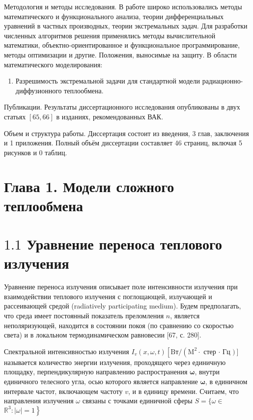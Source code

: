 \documentclass[10pt]{article}
\begin{document}
Методология и методы исследования. В работе широко использовались методы математического и функционального анализа, теории дифференциальных уравнений в частных производных, теории экстремальных задач. Для разработки численных алгоритмов решения применялись методы вычислительной математики, объектно-ориентированное и функциональное программирование, методы оптимизации и другие. Положения, выносимые на защиту. В области математического моделирования:

\begin{enumerate}
  \item Разрешимость экстремальной задачи для стандартной модели радиационно-диффузионного теплообмена.
\end{enumerate}

Публикации. Результаты диссертационного исследования опубликованы в двух статьях $[65,66]$ в изданиях, рекомендованных ВАК.

Объем и структура работы. Диссертация состоит из введения, 3 глав, заключения и 1 приложения. Полный объём диссертации составляет 46 страниц, включая 5 рисунков и 0 таблиц.

\section{Глава 1. Модели сложного теплообмена}
\section{$1.1$ Уравнение переноса теплового излучения}
Уравнение переноса излучения описывает поле интенсивности излучения при взаимодействии теплового излучения с поглощающей, излучающей и рассеивающей средой (radiatively participating medium). Будем предполагать, что среда имеет постоянный показатель преломления $n$, является неполяризующей, находится в состоянии покоя (по сравнению со скоростью света) и в локальном термодинамическом равновесии [67, с. 280].

Спектральной интенсивностью излучения $I_{v}(x, \omega, t)\left[\mathrm{Bт} /\left(\mathrm{M}^{2} \cdot\right.\right.$ стер $\cdot$ Гц $\left.)\right]$ называется количество энергии излучения, проходящего через единичную площадку, перпендикулярную направлению распространения $\boldsymbol{\omega}$, внутри единичного телесного угла, осью которого является направление $\boldsymbol{\omega}$, в единичном интервале частот, включающем частоту $v$, и в единицу времени. Считаем, что направления излучения $\omega$ связаны с точками единичной сферы $S=\{\omega \in$ $\left.\mathbb{R}^{3}:|\omega|=1\right\}$
\end{document}
